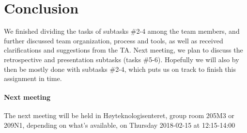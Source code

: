 \documentclass{article}
\begin{document}
\section{Conclusion}

We finished dividing the tasks of subtasks \#2-4 among the team members, and further discussed team organization, process and tools, as well as received clarifications and suggestions from the TA. Next meeting, we plan to discuss the retrospective and presentation subtasks (tasks \#5-6). Hopefully we will also by then be mostly done with subtasks \#2-4, which puts us on track to finish this assignment in time.

\paragraph{Next meeting}

The next meeting will be held in Høyteknologisenteret, group room 205M3 or 209N1, depending on what's available, on Thursday 2018-02-15 at 12:15-14:00
\end{document}
